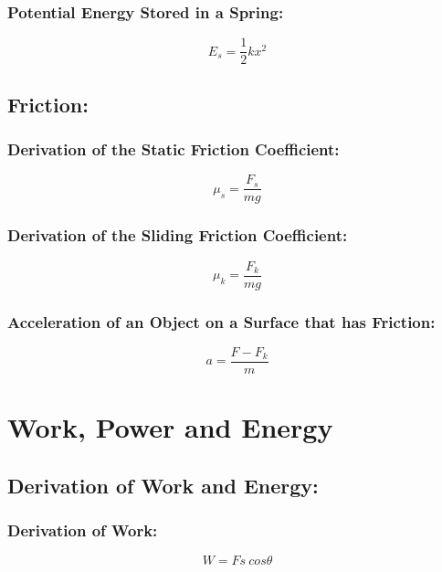 \documentclass[a4paper]{report}
\begin{document}
        \subsection{Potential Energy Stored in a Spring: }
            \begin{equation}
                E_s = \frac{1}{2}kx^2
            \end{equation}
   \section{Friction: }
        \subsection{Derivation of the Static Friction Coefficient: }
            \begin{equation}
                \mu_s = \frac{F_s}{mg}
            \end{equation}
        \subsection{Derivation of the Sliding Friction Coefficient: }
            \begin{equation}
                \mu_k = \frac{F_k}{mg}
            \end{equation}
        \subsection{Acceleration of an Object on a Surface that has Friction: }
            \begin{equation}
                a = \frac{F-F_k}{m}
            \end{equation}

            
\chapter{Work, Power and Energy}
    \section{Derivation of Work and Energy: }
        \subsection{Derivation of Work: }
            \begin{equation}
                W = Fs \ cos\theta
            \end{equation}
\end{document}

